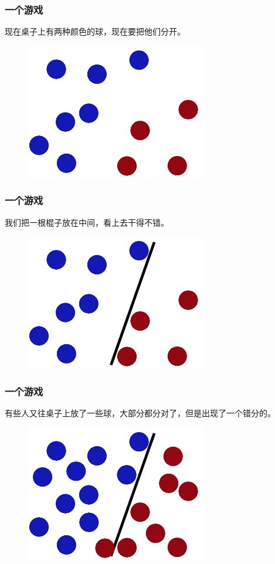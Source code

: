 \begin{frame}
\frametitle{一个游戏}	
现在桌子上有两种颜色的球，现在要把他们分开。
           
	\begin{figure}[ht]
	\centering
	\includegraphics[width=0.5\linewidth]{partition/img/svm_2.jpg}  
	\end{figure}

\end{frame} 

\begin{frame}
\frametitle{一个游戏}	
我们把一根棍子放在中间，看上去干得不错。
           
	\begin{figure}[ht]
	\centering
	\includegraphics[width=0.5\linewidth]{partition/img/svm_3.jpg}  
	\end{figure}

\end{frame} 

\begin{frame}
\frametitle{一个游戏}	
有些人又往桌子上放了一些球，大部分都分对了，但是出现了一个错分的。
           
	\begin{figure}[ht]
	\centering
	\includegraphics[width=0.5\linewidth]{partition/img/svm_4.jpg}  
	\end{figure}

\end{frame} 

